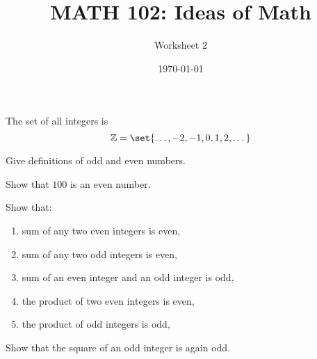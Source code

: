 \documentclass[12pt]{amsart}
\title{ MATH 102: Ideas  of Math }
\author{ Worksheet 2 }
\date{\today}
\begin{document}
\maketitle

The set of all integers is
\begin{equation*}
	\Z = \set{\dots, -2, -1, 0 , 1, 2, \dots}
\end{equation*}
\begin{question}
	Give definitions of odd and even numbers.
\end{question}

\begin{question}
	Show that $100$ is an even number.
\end{question}

\begin{question}
	Show that:
	\begin{enumerate}
		\item sum of any two even integers is even,
		\item sum of any two odd integers is even,
		\item sum of an even integer and an odd integer is odd,
		\item the product of two even integers is even,
		\item the product of odd integers is odd,
	\end{enumerate}
\end{question}

\begin{question}
	Show that the square of an odd integer is again odd.
\end{question}

\printbibliography
%
%
\end{document}
